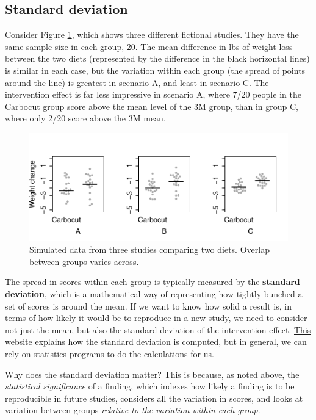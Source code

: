 \documentclass{krantz}
\begin{document}
\hypertarget{standard-deviation}{%
\subsection{Standard deviation}\label{standard-deviation}}

Consider Figure \ref{fig:demo-variation}, which shows three different fictional studies. They have the same sample size in each group, 20. The mean difference in lbs of weight loss between the two diets (represented by the difference in the black horizontal lines) is similar in each case, but the variation within each group (the spread of points around the line) is greatest in scenario A, and least in scenario C. The intervention effect is far less impressive in scenario A, where 7/20 people in the Carbocut group score above the mean level of the 3M group, than in group C, where only 2/20 score above the 3M mean.

\begin{figure}
\includegraphics[width=0.9\linewidth]{images_bw/demo-variation} \caption{Simulated data from three studies comparing two diets. Overlap between groups varies across.}\label{fig:demo-variation}
\end{figure}

The spread in scores within each group is typically measured by the \textbf{standard deviation}, which is a mathematical way of representing how tightly bunched a set of scores is around the mean. If we want to know how solid a result is, in terms of how likely it would be to reproduce in a new study, we need to consider not just the mean, but also the standard deviation of the intervention effect. \href{https://www.mathsisfun.com/data/standard-deviation.html}{This website} explains how the standard deviation is computed, but in general, we can rely on statistics programs to do the calculations for us.

Why does the standard deviation matter? This is because, as noted above, the \emph{statistical significance} of a finding, which indexes how likely a finding is to be reproducible in future studies, considers all the variation in scores, and looks at variation between groups \emph{relative to the variation within each group}.
\end{document}
